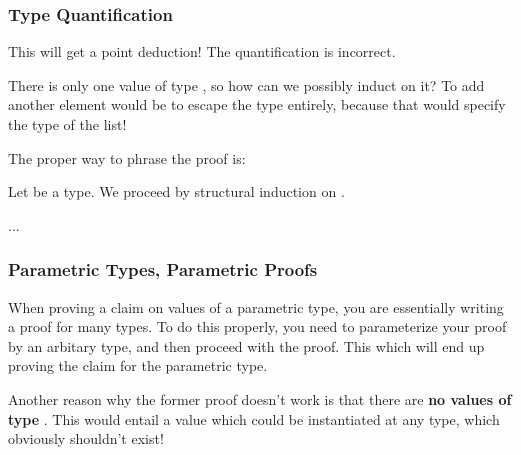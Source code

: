 \documentclass[aspectratio=169]{beamer}
\begin{document}
\begin{frame}[fragile]
  \frametitle{Type Quantification}

  This will get a point deduction! The quantification is incorrect.

  \pause
  \vspace{\fill}

  There is only one value of type , so how can we possibly induct
  on it? To add another element would be to escape the type entirely, because
  that would specify the type of the list!

  \pause
  \vspace{\fill}

  The proper way to phrase the proof is:

  \pause
  \vspace{\fill}

  Let  be a type. We proceed by structural induction on .

  \vspace{\fill}

  ...

  \vspace{\fill}

\end{frame}

\begin{frame}[fragile]
  \frametitle{Parametric Types, Parametric Proofs}

  When proving a claim on values of a parametric type, you are essentially writing
  a proof for many types. To do this properly, you need to parameterize your proof
  by an arbitary type, and then proceed with the proof. This which will end up
  proving the claim for the parametric type.

  \pause
  \vspace{\fill}

  Another reason why the former proof doesn't work is that there are
  \textbf{no values of type }. This would entail a value which could
  be instantiated at any type, which obviously shouldn't exist!
\end{frame}
\end{document}
